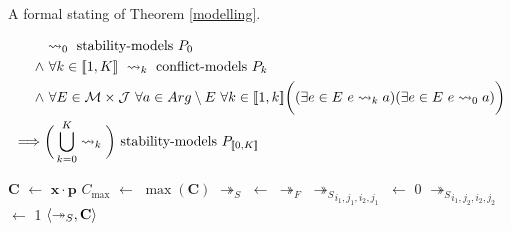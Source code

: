 A formal stating of Theorem \ref{modelling}.

\begin{align*}
&\rightsquigarrow_0\text{ stability-models }P_0\\
\land&\ \forall k\in\intset{1,K}\ \rightsquigarrow_k\text{ conflict-models }P_k\\
\land&\ \forall E\in\mathcal{M}\times\mathcal{J}\ \forall a\in Arg\setminus E\ \forall k\in\intset{1,k}\bigg((\exists e\in E\ e\rightsquigarrow_k a)(\exists e\in E\ e\rightsquigarrow_0 a)\bigg)\\
\implies&\bigg(\bigcup_{k=0}^K\rightsquigarrow_k\bigg)\text{ stability-models }P_{\intset{0,K}}
\end{align*}

\begin{algorithm}[H]
	\caption{}
	\begin{algorithmic}[1]
			\State $\mathbf{C}$ $\gets$ $\mathbf{x}\cdot\mathbf{p}$
			\State $C_{\max}$ $\gets$ $\max(\mathbf{C})$
			\State $\twoheadrightarrow_S$ $\gets$ $\twoheadrightarrow_F$
									\State ${\twoheadrightarrow_S}_{i_1,j_1,i_2,j_1}$ $\gets$ 0
								\EndIf
										\State ${\twoheadrightarrow_S}_{i_1,j_2,i_2,j_2}$ $\gets$ 1
									\EndIf
								\EndFor
							\EndFor
						\EndIf
					\EndFor
				\EndIf
			\EndFor
			\State \Return $\langle{\twoheadrightarrow_S},{\mathbf{C}}\rangle$
		\EndFunction
	\end{algorithmic}
\end{algorithm}